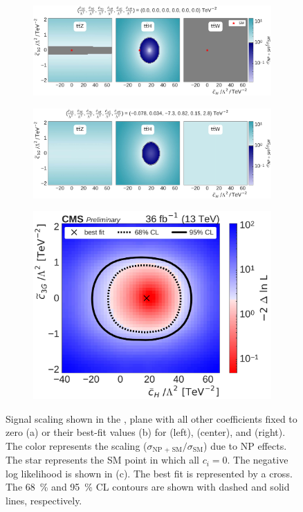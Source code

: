 \begin{figure}
  \vspace{-1cm}
  \begin{subfigure}{\linewidth}
    \centering
    \includegraphics[width=\linewidth]{figures/thirteen-TeV/scaling-frozen/cH_tc3G}
    \caption{}
  \end{subfigure}
  \begin{subfigure}{\linewidth}
    \centering
    \includegraphics[width=\linewidth]{figures/thirteen-TeV/scaling/cH_tc3G}
    \caption{}
  \end{subfigure}
  \begin{subfigure}{\linewidth}
    \centering
    \includegraphics[width=0.6\linewidth]{figures/thirteen-TeV/nll/cH_tc3G}
    \caption{}
  \end{subfigure}
  \vspace{-1cm}
  \setlength{\capwidth}{15cm}
  \caption[Signal scaling and profile likelihood scan in the \cH, \tcthreeG plane]{Signal scaling
  shown in the \cH, \tcthreeG plane with all other coefficients fixed to zero (a) or their best-fit
  values (b) for \ttZ (left), \ttH (center), and \ttW (right). The color represents the scaling
  ($\sigma_\text{NP + SM} / \sigma_\text{SM}$) due to NP effects. The star represents the SM point in
  which all $c_i=0$. The negative log likelihood is shown in (c). The best fit is represented by a
  cross. The \SI{68}{\percent} and \SI{95}{\percent} CL contours are shown with dashed and solid
  lines, respectively.}
\end{figure}


